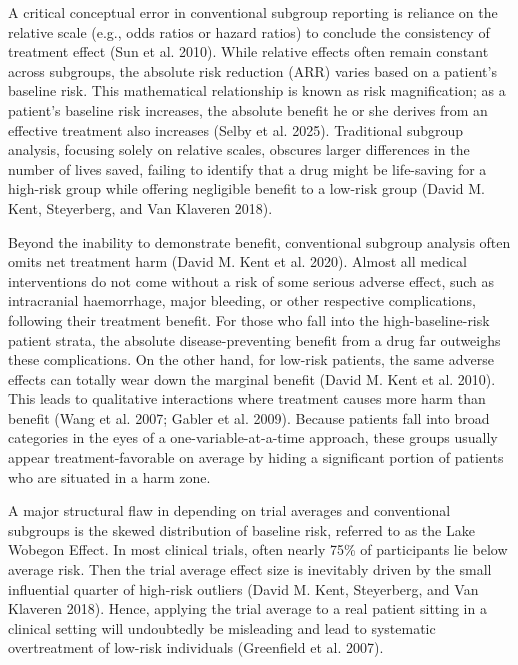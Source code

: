 \documentclass{article}
\begin{document}
A critical conceptual error in conventional subgroup reporting is
reliance on the relative scale (e.g., odds ratios or hazard ratios) to
conclude the consistency of treatment effect (Sun et al. 2010). While
relative effects often remain constant across subgroups, the absolute
risk reduction (ARR) varies based on a patient's baseline risk. This
mathematical relationship is known as risk magnification; as a patient's
baseline risk increases, the absolute benefit he or she derives from an
effective treatment also increases (Selby et al. 2025). Traditional
subgroup analysis, focusing solely on relative scales, obscures larger
differences in the number of lives saved, failing to identify that a
drug might be life-saving for a high-risk group while offering
negligible benefit to a low-risk group (David M. Kent, Steyerberg, and
Van Klaveren 2018).

Beyond the inability to demonstrate benefit, conventional subgroup
analysis often omits net treatment harm (David M. Kent et al. 2020).
Almost all medical interventions do not come without a risk of some
serious adverse effect, such as intracranial haemorrhage, major
bleeding, or other respective complications, following their treatment
benefit. For those who fall into the high-baseline-risk patient strata,
the absolute disease-preventing benefit from a drug far outweighs these
complications. On the other hand, for low-risk patients, the same
adverse effects can totally wear down the marginal benefit (David M.
Kent et al. 2010). This leads to qualitative interactions where
treatment causes more harm than benefit (Wang et al. 2007; Gabler et al.
2009). Because patients fall into broad categories in the eyes of a
one-variable-at-a-time approach, these groups usually appear
treatment-favorable on average by hiding a significant portion of
patients who are situated in a harm zone.

A major structural flaw in depending on trial averages and conventional
subgroups is the skewed distribution of baseline risk, referred to as
the Lake Wobegon Effect. In most clinical trials, often nearly 75\% of
participants lie below average risk. Then the trial average effect size
is inevitably driven by the small influential quarter of high-risk
outliers (David M. Kent, Steyerberg, and Van Klaveren 2018). Hence,
applying the trial average to a real patient sitting in a clinical
setting will undoubtedly be misleading and lead to systematic
overtreatment of low-risk individuals (Greenfield et al. 2007).
\end{document}
